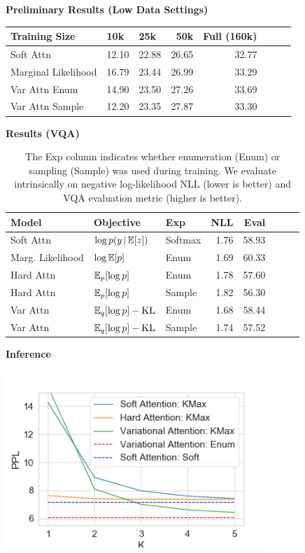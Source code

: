 \documentclass[aspectratio=169]{beamer}
\newcommand{\thetitle}[1]{{\begin{center}\textbf{{#1}}\end{center}}}
\begin{document}
\begin{frame}\thetitle{Preliminary Results (Low Data Settings)}
\begin{table}
  \centering
  \begin{tabular}{lllrrrrr}
    \toprule
    Training Size & 10k  & 25k  & 50k &  Full (160k)\\
    \midrule
  Soft Attn           & 12.10 & 22.88 & 26.65 & 32.77 \\
  Marginal Likelihood & 16.79 & 23.44 & 26.99 & 33.29 \\
  Var Attn Enum       & 14.90 & 23.50 & 27.26 &  33.69 \\
  Var Attn Sample     & 12.20 & 23.35 & 27.87 &  33.30 \\
    \bottomrule
  \end{tabular}
\end{table}
\end{frame}
\begin{frame}\thetitle{Results (VQA)}
\begin{table}
  \centering
  \begin{tabular}{lllrrrrr}
    \toprule
    Model & Objective & Exp  & NLL &  Eval \\
    \midrule
  Soft Attn & $\log p(y \,|\, \mathbb{E}[z])$ & Softmax & 1.76 & 58.93 \\
  Marg. Likelihood & $\log \mathbb{E}[p]$ &  Enum & 1.69  &60.33\\
  Hard Attn  & $\mathbb{E}_p[\log p]$ & Enum & 1.78 &  57.60\\
  Hard Attn  & $\mathbb{E}_p[\log p]$  & Sample &  1.82 &   56.30\\
  Var Attn  & $\mathbb{E}_q[\log p] - \operatorname*{KL}$ & Enum & 1.68 &  58.44 \\
  Var Attn &  $\mathbb{E}_q[\log p] - \operatorname*{KL}$ &Sample& 1.74 &  57.52 \\
    \bottomrule
  \end{tabular}

  \caption{The Exp column indicates
  whether enumeration (Enum) or sampling (Sample) was used during training.
  We evaluate intrinsically on negative log-likelihood NLL (lower is better)
  and VQA evaluation metric (higher is better).}
   \label{tab:eval_nmt}
\end{table}
\end{frame}


\begin{frame}\thetitle{Inference}
\begin{center}
\includegraphics[width=10cm]{sample}
\end{center}

\end{frame}
\end{document}
